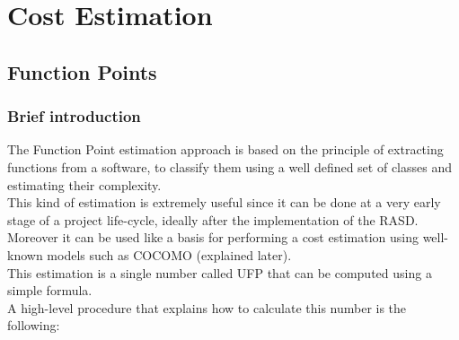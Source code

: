 \newpage
\def\arraystretch{1.15}
\section{Cost Estimation}
\subsection{Function Points}
\subsubsection{Brief introduction}
The Function Point estimation approach is based on the principle of extracting functions from a software, to classify them using a well defined set of classes and estimating their complexity. \\ This kind of estimation is extremely useful since it can be done at a very early stage of a project life-cycle, ideally after the implementation of the RASD. Moreover it can be used like a basis for performing a cost estimation using well-known models such as COCOMO (explained later). \\
This estimation is a single number called UFP that can be computed using a simple formula. \\
A high-level procedure that explains how to calculate this number is the following:
